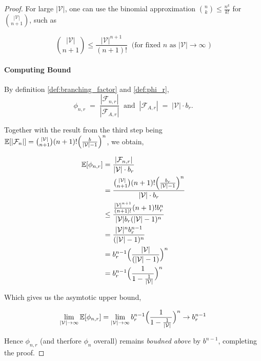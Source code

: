 \begin{proof}[Proof]
                For large $|\mathcal{V}|$, one can use the binomial approximation $\binom{n}{k}\leq\frac{n^k}{k!}$ for $\binom{|\mathcal{V}|}{n+1}$, such as

                \[
                \binom{|\mathcal{V}|}{n+1} \leq \frac{|\mathcal{V}|^{n+1}}{(n+1)!}
                \;\;\text{(for fixed $n$ as $|\mathcal{V}| \to \infty$ )}
                \]

            \paragraph{Computing Bound}

                By definition \ref{def:branching_factor} and \ref{def:phi_r},
                    \[
                    \phi_{n,r}\;=\;\frac{|\mathcal{F}_{n,r}|}{|\mathcal{F}_{A,r}|}
                    \;\;\text{and}\;\;
                    |\mathcal{F}_{A,r}| 
                    \;=\; |\mathcal{V}|\cdot b_r.
                    \]
                    
                Together with the result from the third step being $\mathbb{E}[|\mathcal{F}_n|] = \binom{|\mathcal{V}|}{n+1} (n+1)! \Bigl(\tfrac{b}{|\mathcal{V}|-1}\Bigr)^{n}$, we obtain,

                \begin{align*}
                    \mathbb{E}[\phi_{n,r}] &= \frac{|\mathcal{F}_{n,r}|}{|\mathcal{V}|\cdot b_r} \\
                    &= \frac{\binom{|\mathcal{V}|}{n+1} (n+1)! \Bigl(\tfrac{b_r}{|\mathcal{V}|-1}\Bigr)^{n}}{|\mathcal{V}|\cdot b_r}\\
                    &\leq \frac{\frac{|\mathcal{V}|^{n+1}}{(n+1)!} (n+1)! b_r^n}{|\mathcal{V}|b_r(|\mathcal{V}|-1)^n} \\
                    &= \frac{ |\mathcal{V}|^n b_r^{n-1}}{(|\mathcal{V}|-1)^n} \\
                    &= b_r^{n-1} \Bigl(\frac{ |\mathcal{V}| }{(|\mathcal{V}|-1)}\Bigr)^n\\
                    &= b_r^{n-1} \Bigl(\frac{ 1 }{1-\frac{1}{|\mathcal{V}|}}\Bigr)^n\\
                \end{align*}

                Which gives us the asymtotic upper bound,

                    \[
                    \lim_{|\mathcal{V}|\to\infty} \mathbb{E}[\phi_{n,r}] = \lim_{|\mathcal{V}|\to\infty} b_r^{n-1} \Bigl(\frac{ 1 }{1-\frac{1}{|\mathcal{V}|}}\Bigr)^n \to b_r^{n-1} 
                    \]

                Hence $\phi_{n,r}$ (and therfore $\phi_n$ overall) remains \emph{boudned above} by $b^{n-1}$, completing the proof.

        \end{proof}



